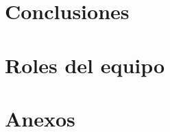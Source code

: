 \documentclass[12pt,letterpaper]{article}
\begin{document}
\section{Conclusiones}

\section*{Roles del equipo}

\clearpage
\printbibliography[title={Referencias}]

\clearpage
\appendix
\section{Anexos}
\end{document}
